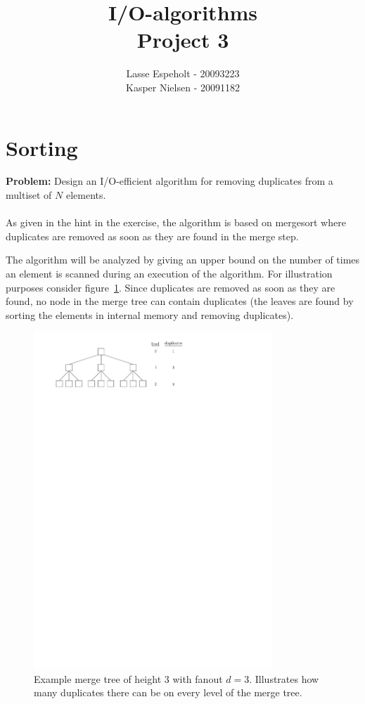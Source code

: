 \documentclass[a4paper,12pt]{article}
\begin{document}
\title{I/O-algorithms\\Project 3}

\author{Lasse Espeholt - 20093223\\
Kasper Nielsen - 20091182\\}

\maketitle

\pagebreak

\section{Sorting}
\textbf{Problem:} Design an I/O-efficient algorithm for removing duplicates from a multiset of $N$ elements.
\\
\\As given in the hint in the exercise, the algorithm is based on mergesort where duplicates are removed as soon as they are found in the merge step.

The algorithm will be analyzed by giving an upper bound on the number of times an element is scanned during an execution of the algorithm. For illustration purposes consider figure~\ref{fig:sorting:mergetree}. Since duplicates are removed as soon as they are found, no node in the merge tree can contain duplicates (the leaves are found by sorting the elements in internal memory and removing duplicates).

\begin{figure}[h!]
  \centering
  \includegraphics[width=0.8\textwidth]{images/mergetree}
  \caption{Example merge tree of height $3$ with fanout $d = 3$. Illustrates how many duplicates there can be on every level of the merge tree.}
  \label{fig:sorting:mergetree}
\end{figure}
\end{document}
